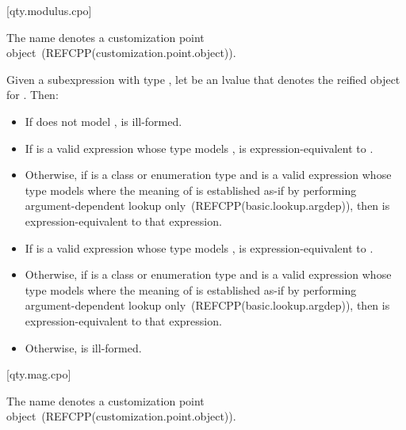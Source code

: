 [qty.modulus.cpo]{}

\pnum
The name  denotes a customization point object~(REFCPP(customization.point.object)).

\pnum
Given a subexpression  with type ,
let  be an lvalue that denotes the reified object for .
Then:
\begin{itemize}
\item
If  does not model ,
 is ill-formed.
\item
If  is a valid expression whose type models ,
 is expression-equivalent to .
\item
Otherwise, if  is a class or enumeration type and
 is a valid expression whose type models 
where the meaning of  is established as-if by performing argument-dependent lookup only~(REFCPP(basic.lookup.argdep)),
then  is expression-equivalent to that expression.
\item
If  is a valid expression whose type models ,
 is expres\-sion-equivalent to .
\item
Otherwise, if  is a class or enumeration type and
 is a valid expression whose type models 
where the meaning of  is established as-if by performing argument-dependent lookup only~(REFCPP(basic.lookup.argdep)),
then  is expression-equivalent to that expression.
\item
Otherwise,  is ill-formed.
\end{itemize}

[qty.mag.cpo]{}

\pnum
The name  denotes a customization point object~(REFCPP(customization.point.object)).


